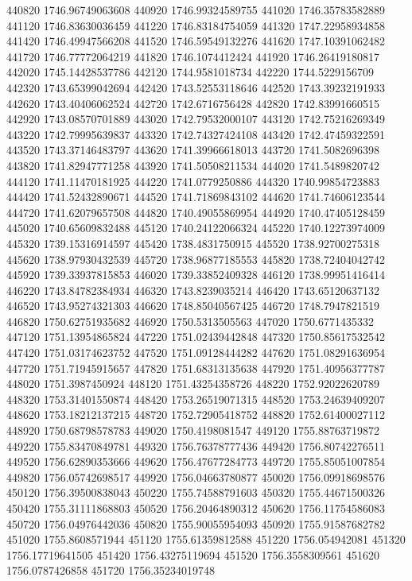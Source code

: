 {440820 1746.96749063608
440920 1746.99324589755
441020 1746.35783582889
441120 1746.83630036459
441220 1746.83184754059
441320 1747.22958934858
441420 1746.49947566208
441520 1746.59549132276
441620 1747.10391062482
441720 1746.77772064219
441820 1746.1074412424
441920 1746.26419180817
442020 1745.14428537786
442120 1744.9581018734
442220 1744.5229156709
442320 1743.65399042694
442420 1743.52553118646
442520 1743.39232191933
442620 1743.40406062524
442720 1742.6716756428
442820 1742.83991660515
442920 1743.08570701889
443020 1742.79532000107
443120 1742.75216269349
443220 1742.79995639837
443320 1742.74327424108
443420 1742.47459322591
443520 1743.37146483797
443620 1741.39966618013
443720 1741.5082696398
443820 1741.82947771258
443920 1741.50508211534
444020 1741.5489820742
444120 1741.11470181925
444220 1741.0779250886
444320 1740.99854723883
444420 1741.52432890671
444520 1741.71869843102
444620 1741.74606123544
444720 1741.62079657508
444820 1740.49055869954
444920 1740.47405128459
445020 1740.65609832488
445120 1740.24122066324
445220 1740.12273974009
445320 1739.15316914597
445420 1738.4831750915
445520 1738.92700275318
445620 1738.97930432539
445720 1738.96877185553
445820 1738.72404042742
445920 1739.33937815853
446020 1739.33852409328
446120 1738.99951416414
446220 1743.84782384934
446320 1743.8239035214
446420 1743.65120637132
446520 1743.95274321303
446620 1748.85040567425
446720 1748.7947821519
446820 1750.62751935682
446920 1750.5313505563
447020 1750.6771435332
447120 1751.13954865824
447220 1751.02439442848
447320 1750.85617532542
447420 1751.03174623752
447520 1751.09128444282
447620 1751.08291636954
447720 1751.71945915657
447820 1751.68313135638
447920 1751.40956377787
448020 1751.3987450924
448120 1751.43254358726
448220 1752.92022620789
448320 1753.31401550874
448420 1753.26519071315
448520 1753.24639409207
448620 1753.18212137215
448720 1752.72905418752
448820 1752.61400027112
448920 1750.68798578783
449020 1750.4198081547
449120 1755.88763719872
449220 1755.83470849781
449320 1756.76378777436
449420 1756.80742276511
449520 1756.62890353666
449620 1756.47677284773
449720 1755.85051007854
449820 1756.05742698517
449920 1756.04663780877
450020 1756.09918698576
450120 1756.39500838043
450220 1755.74588791603
450320 1755.44671500326
450420 1755.31111868803
450520 1756.20464890312
450620 1756.11754586083
450720 1756.04976442036
450820 1755.90055954093
450920 1755.91587682782
451020 1755.8608571944
451120 1755.61359812588
451220 1756.054942081
451320 1756.17719641505
451420 1756.43275119694
451520 1756.3558309561
451620 1756.0787426858
451720 1756.35234019748
}
